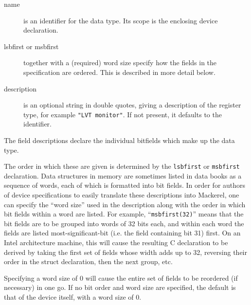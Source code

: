 \documentclass[a4paper,11pt,twoside]{report}
\begin{document}
\begin{description}

\item[name] is an identifier for the data type.  Its scope is the
  enclosing device declaration. 

\item[lsbfirst or msbfirst] together with a (required) word size
  specify how the fields in the specification are ordered.  This is
  described in more detail below. 

\item[description] is an optional string in double quotes, giving a
  description of the register type, for example \texttt{"LVT
    monitor"}.   If not present, it defaults to the identifier.  

\end{description}

The field descriptions declare the individual bitfields which make up
the data type.  

The order in which these are given is determined
by the \texttt{lsbfirst} or \texttt{msbfirst} declaration.  Data
structures in memory are sometimes listed in data books as a sequence
of words, each of which is formatted into bit fields.  In order for
authors of device specifications to easily translate these
descriptions into Mackerel, one can specify the ``word size'' used in
the description along with the order in which bit fields within a
word are listed.  For example, ``\texttt{msbfirst(32)}'' means that
the bit fields are to be grouped into words of 32 bits each, and
within each word the fields are listed most-significant-bit (i.e. the
field containing bit 31) first.  On an Intel architecture machine,
this will cause the resulting C declaration to be derived by taking
the first set of fields whose width adds up to 32, reversing their
order in the struct declaration, then the next group, etc. 

Specifying a word size of 0 will cause the entire set of fields to be
reordered (if necessary) in one go.  If no bit order and word size are
specified, the default is that of the device itself, with a word size
of 0. 
\end{document}
